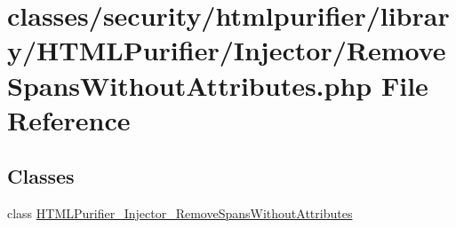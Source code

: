\hypertarget{RemoveSpansWithoutAttributes_8php}{\section{classes/security/htmlpurifier/library/\+H\+T\+M\+L\+Purifier/\+Injector/\+Remove\+Spans\+Without\+Attributes.php File Reference}
\label{RemoveSpansWithoutAttributes_8php}
}
\subsection*{Classes}
\begin{DoxyCompactItemize}
\item 
class \hyperlink{classHTMLPurifier__Injector__RemoveSpansWithoutAttributes}{H\+T\+M\+L\+Purifier\+\_\+\+Injector\+\_\+\+Remove\+Spans\+Without\+Attributes}
\end{DoxyCompactItemize}
